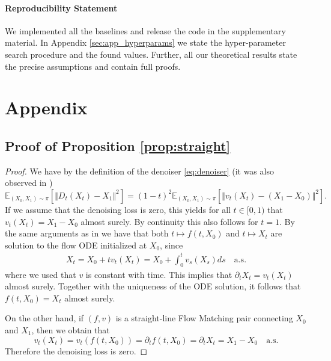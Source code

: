 \documentclass{article} %
\theoremstyle{definition}
\begin{document}
\paragraph{Reproducibility Statement}
We implemented all the baselines and release the code in the supplementary material. In Appendix \ref{sec:app_hyperparams} we state the hyper-parameter search procedure and the found values. Further, all our theoretical results state the precise assumptions and contain full proofs. 

 


\newpage
\appendix
\section{Appendix}

\subsection{Proof of Proposition \ref{prop:straight}}\label{sec:app_proof_straight}


\begin{proof}
We have by the definition of the denoiser \eqref{eq:denoiser} (it was also observed in \cite{pmlr-v202-lee23j})
$$
\mathbb{E}_{(X_0,X_1) \sim \pi}[\Vert D_t(X_t) -X_1 \Vert^2] = (1-t)^2 \mathbb{E}_{(X_0,X_1) \sim \pi}[\Vert v_t(X_t)- (X_1-X_0)\Vert^2].
$$ 
If we assume that the denoising loss is zero, this yields for all $t\in [0,1)$ that $v_t(X_t) = X_1 - X_0$ almost surely. By continuity this also follows for $t = 1$.
 By the same arguments as in \cite[Theorem 3.6 iii)+ iv)]{liu2023flow} we have that both $t \mapsto f(t, X_0)$ and $t \mapsto X_t$ are solution to the flow ODE initialized at $X_0$, since
\begin{align}
    X_t = X_0 + t v_t(X_t) 
    = X_0+ \int_0^t v_s(X_s) ds\quad \text{a.s}.
\end{align}
where we used that $v$ is constant with time.
This implies that $\partial_t X_t = v_t(X_t)$ almost surely. Together with the uniqueness of the  ODE solution, it follows that $f(t,X_0) = X_t$ almost surely.


On the other hand, if $(f,v)$ is a straight-line Flow Matching pair connecting $X_0$ and $X_1$, then we obtain that 
\begin{equation}
    v_t(X_t) = v_t(f(t, X_0)) = \partial_t f (t, X_0) =  \partial_t X_t = X_1 - X_0\quad \text{a.s}.
\end{equation}
Therefore the denoising loss is zero.
\end{proof}
\end{document}
